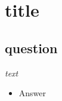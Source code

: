 \documentclass{article}
\begin{document}
\section{title}

\subsection{question}
\textit{text}
\begin{itemize}
\item Answer
\end{itemize}
\end{document}
